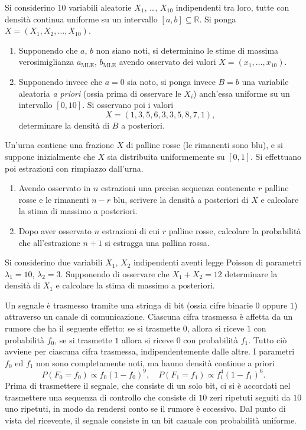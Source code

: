 \documentclass[
  italian,
  letterpaper,
]{book}
\providecommand{\tightlist}{%
  \setlength{\itemsep}{0pt}\setlength{\parskip}{0pt}}
\newcommand{\R}{\mathbb{R}}
\newcommand{\mle}{\operatorname{MLE}}
\theoremstyle{definition}
\theoremstyle{remark}
\begin{document}
Si considerino \(10\) variabili aleatorie \(X_1\), \ldots, \(X_{10}\)
indipendenti tra loro, tutte con densità continua uniforme su un
intervallo \([a,b] \subseteq \R\). Si ponga
\(X=(X_1, X_2, \ldots, X_{10})\).

\begin{enumerate}
\def\labelenumi{\arabic{enumi}.}
\tightlist
\item
  Supponendo che \(a\), \(b\) non siano noti, si determinino le stime di
  massima verosimiglianza \(a_{\mle}\), \(b_{\mle}\) avendo osservato
  dei valori \(X=(x_1, \ldots, x_{10})\).
\item
  Supponendo invece che \(a=0\) sia noto, si ponga invece \(B=b\) una
  variabile aleatoria \emph{a priori} (ossia prima di osservare le
  \(X_i\)) anch'essa uniforme su un intervallo \([0,10]\). Si osservano
  poi i valori \[ X=(1,3,5,6,3,3,5,8,7,1),\] determinare la densità di
  \(B\) a posteriori.
\end{enumerate}

Un'urna contiene una frazione \(X\) di palline rosse (le rimanenti sono
blu), e si suppone inizialmente che \(X\) sia distribuita uniformemente
su \([0,1]\). Si effettuano poi estrazioni con rimpiazzo dall'urna.

\begin{enumerate}
\def\labelenumi{\arabic{enumi}.}
\item
  Avendo osservato in \(n\) estrazioni una precisa sequenza contenente
  \(r\) palline rosse e le rimanenti \(n-r\) blu, scrivere la densità a
  posteriori di \(X\) e calcolare la stima di massimo a posteriori.
\item
  Dopo aver osservato \(n\) estrazioni di cui \(r\) palline rosse,
  calcolare la probabilità che all'estrazione \(n+1\) si estragga una
  pallina rossa.
\end{enumerate}

Si considerino due variabili \(X_1\), \(X_2\) indipendenti aventi legge
Poisson di parametri \(\lambda_1= 10\), \(\lambda_2=3\). Supponendo di
osservare che \(X_1+X_2=12\) determinare la densità di \(X_1\) e
calcolare la stima di massimo a posteriori.

Un segnale è trasmesso tramite una stringa di bit (ossia cifre binarie
\(0\) oppure \(1\)) attraverso un canale di comunicazione. Ciascuna
cifra trasmessa è affetta da un rumore che ha il seguente effetto: se si
trasmette \(0\), allora si riceve \(1\) con probabilità \(f_0\), se si
trasmette \(1\) allora si riceve \(0\) con probabilità \(f_1\). Tutto
ciò avviene per ciascuna cifra trasmessa, indipendentemente dalle altre.
I parametri \(f_0\) ed \(f_1\) non sono completamente noti, ma hanno
densità continue a priori
\[ P( F_0 = f_0 ) \propto f_0(1-f_0)^{9}, \quad P( F_1 = f_1 ) \propto f_1^4(1-f_1)^{6}.\]
Prima di trasmettere il segnale, che consiste di un solo bit, ci si è
accordati nel trasmettere una sequenza di controllo che consiste di
\(10\) zeri ripetuti seguiti da \(10\) uno ripetuti, in modo da rendersi
conto se il rumore è eccessivo. Dal punto di vista del ricevente, il
segnale consiste in un bit casuale con probabilità uniforme.
\end{document}
